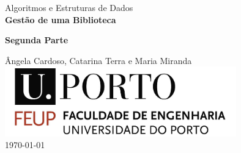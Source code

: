

\begin{titlepage}
\begin{center}
 
\vspace*{3cm}

{\Large Algoritmos e Estruturas de Dados}\\[2cm]

{\Huge \bfseries Gestão de uma Biblioteca \\[2cm]}

{\bfseries Segunda Parte}

{\large Ângela Cardoso, Catarina Terra e Maria Miranda}\\[2cm]

\includegraphics[width=10cm]{feup_logo.jpg}\\[2cm]


{\large \today}

\end{center}
\end{titlepage}